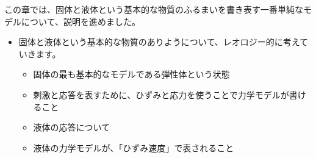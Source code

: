 \documentclass[uplatex,dvipdfmx,a4paper,11pt]{jsarticle}
\begin{document}
この章では、固体と液体という基本的な物質のふるまいを書き表す一番単純なモデルについて、説明を進めました。
	\begin{boxnote}
		\large
		\begin{itemize}
			\item 固体と液体という基本的な物質のありようについて、レオロジー的に考えていきます。
			\begin{itemize}
				\item 固体の最も基本的なモデルである弾性体という状態
				\item 刺激と応答を表すために、ひずみと応力を使うことで力学モデルが書けること
				\item 液体の応答について
				\item 液体の力学モデルが、「ひずみ速度」で表されること
			\end{itemize} 
		\end{itemize}
	\end{boxnote}

	\newpage
\end{document}
